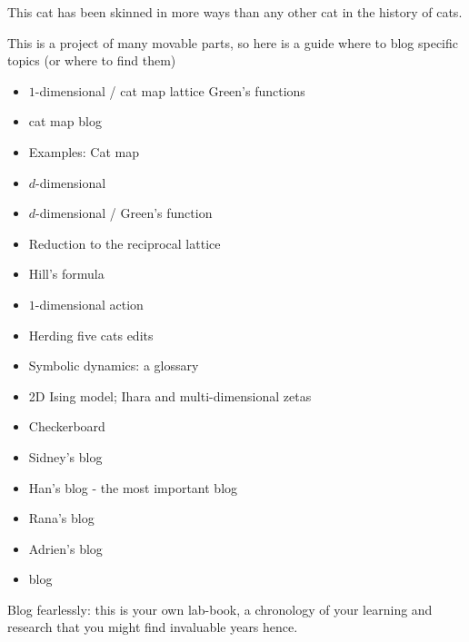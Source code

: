 \documentclass[letter,10pt,openany]{../inputs/DasBuch} %
\begin{document}

\maketitle
\thispagestyle{empty}
\tableofcontents

\newpage
\begin{bartlett}{
This cat has been skinned in more ways than any other cat in the history of cats.
        }
\end{bartlett}
\bigskip

This is a project of many movable parts, so here is a guide
where to blog specific topics (or where to find them)

\begin{itemize}
  \item
{} $1$-dimensional / cat map lattice Green's functions
  \item
{}  cat map blog %
  \item
{} Examples: Cat map %
  \item
{}  $d$-dimensional {\catlatt}
  \item
{} $d$-dimensional / {\catlatt} Green's function
  \item
{} {Reduction to the reciprocal lattice}
  \item
{} Hill's formula
  \item
{} $1$-dimensional action
  \item
{} {Herding five cats} edits
  \item
{} Symbolic dynamics: a glossary
  \item
{} 2D Ising model; Ihara and multi-dimensional zetas
  \item
{} Checkerboard
  \item
{}  {Sidney's blog}
  \item
{}   {Han's blog} - the most important blog
  \item
{}   {Rana's blog}
  \item
{}  {Adrien's blog}
  \item
{} {\catLatt} blog
\end{itemize}
Blog fearlessly: this is your own lab-book, a chronology of
your learning and research that you might find invaluable years hence.
\end{document}
